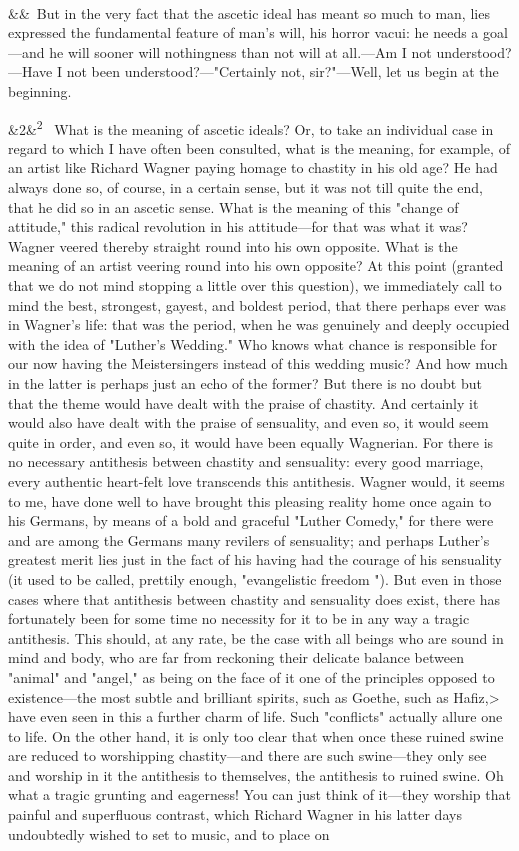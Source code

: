 \documentclass[12pt]{article}
\newcommand{\para}[1][]{\par\noindent\ifx&#1&\else\textsuperscript{\footnotesize #1}~\fi}
\begin{document}
\para But in the very fact that the ascetic ideal has meant so much to man, lies expressed the fundamental feature of man's will, his horror vacui: he needs a goal---and he will sooner will nothingness than not will at all.---Am I not understood?---Have I not been understood?---"Certainly not, sir?"---Well, let us begin at the beginning.

\para[2] What is the meaning of ascetic ideals? Or, to take an individual case in regard to which I have often been consulted, what is the meaning, for example, of an artist like Richard Wagner paying homage to chastity in his old age? He had always done so, of course, in a certain sense, but it was not till quite the end, that he did so in an ascetic sense. What is the meaning of this "change of attitude," this radical revolution in his attitude---for that was what it was? Wagner veered thereby straight round into his own opposite. What is the meaning of an artist veering round into his own opposite? At this point (granted that we do not mind stopping a little over this question), we immediately call to mind the best, strongest, gayest, and boldest period, that there perhaps ever was in Wagner's life: that was the period, when he was genuinely and deeply occupied with the idea of "Luther's Wedding." Who knows what chance is responsible for our now having the Meistersingers instead of this wedding music? And how much in the latter is perhaps just an echo of the former? But there is no doubt but that the theme would have dealt with the praise of chastity. And certainly it would also have dealt with the praise of sensuality, and even so, it would seem quite in order, and even so, it would have been equally Wagnerian. For there is no necessary antithesis between chastity and sensuality: every good marriage, every authentic heart-felt love transcends this antithesis. Wagner would, it seems to me, have done well to have brought this pleasing reality home once again to his Germans, by means of a bold and graceful "Luther Comedy," for there were and are among the Germans many revilers of sensuality; and perhaps Luther's greatest merit lies just in the fact of his having had the courage of his sensuality (it used to be called, prettily enough, "evangelistic freedom "). But even in those cases where that antithesis between chastity and sensuality does exist, there has fortunately been for some time no necessity for it to be in any way a tragic antithesis. This should, at any rate, be the case with all beings who are sound in mind and body, who are far from reckoning their delicate balance between "animal" and "angel," as being on the face of it one of the principles opposed to existence---the most subtle and brilliant spirits, such as Goethe, such as Hafiz,> have even seen in this a further charm of life. Such "conflicts" actually allure one to life. On the other hand, it is only too clear that when once these ruined swine are reduced to worshipping chastity---and there are such swine---they only see and worship in it the antithesis to themselves, the antithesis to ruined swine. Oh what a tragic grunting and eagerness! You can just think of it---they worship that painful and superfluous contrast, which Richard Wagner in his latter days undoubtedly wished to set to music, and to place on 
\end{document}

